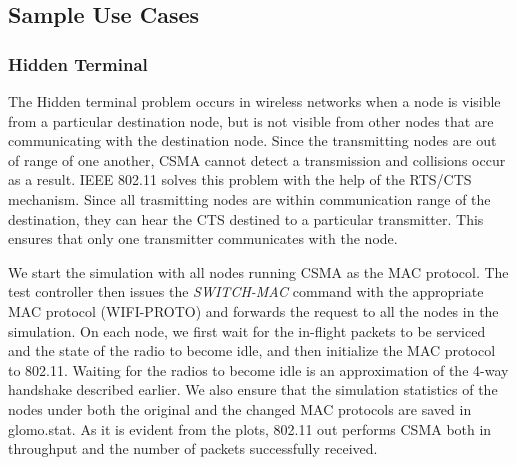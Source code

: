 \subsection{Sample Use Cases}

\subsubsection{Hidden Terminal}
The Hidden terminal problem occurs in wireless networks when a node is visible from a particular destination node, but is not visible from other nodes that are communicating with the destination node. Since the transmitting nodes are out of range of one another, CSMA cannot detect a transmission and collisions occur as a result. IEEE 802.11 solves this problem with the help of the RTS/CTS mechanism. Since all trasmitting nodes are within communication range of the destination, they can hear the CTS destined to a particular transmitter. This ensures that only one transmitter communicates with the node. 

We start the simulation with all nodes running CSMA as the MAC protocol. The test controller then issues the \emph{SWITCH-MAC} command with the appropriate MAC protocol (WIFI-PROTO) and forwards the request to all the nodes in the simulation. On each node, we first wait for the in-flight packets to be serviced and the state of the radio to become idle, and then initialize the MAC protocol to 802.11. Waiting for the radios to become idle is an approximation of the 4-way handshake described earlier. We also ensure that the simulation statistics of the nodes under both the original and the changed MAC protocols are saved in glomo.stat. As it is evident from the plots, 802.11 out performs CSMA both in throughput and the number of packets successfully received.

